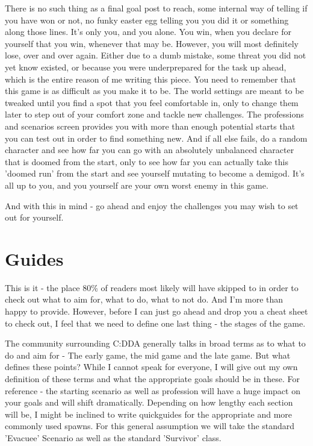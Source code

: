 \documentclass[11pt]{report}
\begin{document}
There is no such thing as a final goal post to reach, some internal way of telling if you have won or not, no funky easter egg telling you you did it or something along those lines.
It's only you, and you alone. You win, when you declare for yourself that you win, whenever that may be. However, you will most definitely lose, over and over again. Either due to a dumb mistake, some threat you did not yet know existed, or because you were underprepared for the task up ahead, which is the entire reason of me writing this piece. You need to remember that this game is as difficult as you make it to be. The world settings are meant to be tweaked until you find a spot that you feel comfortable in, only to change them later to step out of your comfort zone and tackle new challenges. The professions and scenarios screen provides you with more than enough potential starts that you can test out in order to find something new. And if all else fails, do a random character and see how far you can go with an absolutely unbalanced character that is doomed from the start, only to see how far you can actually take this 'doomed run' from the start and see yourself mutating to become a demigod. It's all up to you, and you yourself are your own worst enemy in this game.

And with this in mind - go ahead and enjoy the challenges you may wish to set out for yourself.



\chapter{Guides}
This is it - the place 80\% of readers most likely will have skipped to in order to check out what to aim for, what to do, what to not do. And I'm more than happy to provide. However, before I can just go ahead and drop you a cheat sheet to check out, I feel that we need to define one last thing - the stages of the game.

The community surrounding C:DDA generally talks in broad terms as to what to do and aim for - The early game, the mid game and the late game. But what defines these points? While I cannot speak for everyone, I will give out my own definition of these terms and what the appropriate goals should be in these. For reference - the starting scenario as well as profession will have a huge impact on your goals and will shift dramatically. Depending on how lengthy each section will be, I might be inclined to write quickguides for the appropriate and more commonly used spawns. For this general assumption we will take the standard 'Evacuee' Scenario as well as the standard 'Survivor' class.
\end{document}
